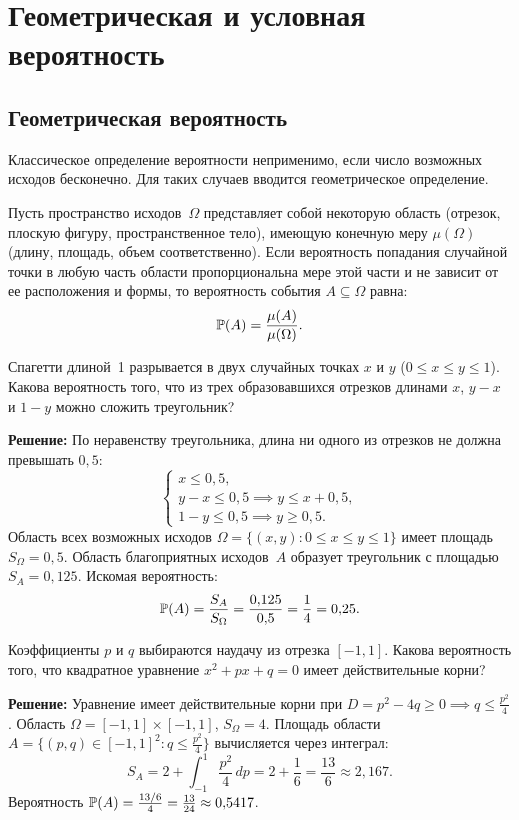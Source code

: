 \section{Геометрическая и условная вероятность}

\subsection{Геометрическая вероятность}
Классическое определение вероятности неприменимо, если число возможных исходов бесконечно. Для таких случаев вводится геометрическое определение.

Пусть пространство исходов~$\Omega$ представляет собой некоторую область (отрезок, плоскую фигуру, пространственное тело), имеющую конечную меру $\mu(\Omega)$ (длину, площадь, объем соответственно). Если вероятность попадания случайной точки в любую часть области пропорциональна мере этой части и не зависит от ее расположения и формы, то вероятность события $A \subseteq \Omega$ равна:
\[
\mathbb{P}(A) = \frac{\mu(A)}{\mu(\Omega)}.
\]

\begin{example}
Спагетти длиной~1 разрывается в двух случайных точках $x$ и $y$ ($0 \le x \le y \le 1$). Какова вероятность того, что из трех образовавшихся отрезков длинами $x$, $y-x$ и $1-y$ можно сложить треугольник?

\textbf{Решение:} По неравенству треугольника, длина ни одного из отрезков не должна превышать $0{,}5$:
\[
\begin{cases} x \le 0{,}5, \\ y - x \le 0{,}5 \implies y \le x + 0{,}5, \\ 1 - y \le 0{,}5 \implies y \ge 0{,}5. \end{cases}
\]
Область всех возможных исходов $\Omega = \{(x,y): 0 \le x \le y \le 1\}$ имеет площадь $S_\Omega = 0{,}5$. Область благоприятных исходов~$A$ образует треугольник с площадью $S_A = 0{,}125$. Искомая вероятность:
\[
\mathbb{P}(A) = \frac{S_A}{S_\Omega} = \frac{0{,}125}{0{,}5} = \frac{1}{4} = 0{,}25.
\]
\end{example}

\begin{example}
Коэффициенты $p$ и $q$ выбираются наудачу из отрезка $[-1, 1]$. Какова вероятность того, что квадратное уравнение $x^2 + px + q = 0$ имеет действительные корни?

\textbf{Решение:} Уравнение имеет действительные корни при $D = p^2 - 4q \ge 0 \implies q \le \frac{p^2}{4}$. 
Область $\Omega = [-1,1] \times [-1,1]$, $S_\Omega = 4$. 
Площадь области $A = \{(p,q) \in [-1,1]^2 : q \le \frac{p^2}{4}\}$ вычисляется через интеграл:
\[
S_A = 2 + \int_{-1}^1 \frac{p^2}{4} \, dp = 2 + \frac{1}{6} = \frac{13}{6} \approx 2{,}167.
\]
Вероятность $\mathbb{P}(A) = \frac{13/6}{4} = \frac{13}{24} \approx 0{,}5417$.
\end{example}

